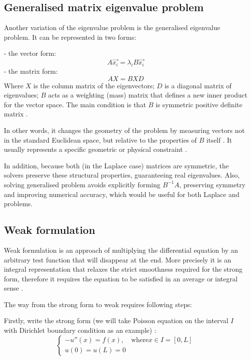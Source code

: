 \documentclass[conference]{IEEEtran}
\begin{document}
\subsection{Generalised matrix eigenvalue problem}
Another variation of the eigenvalue problem is the generalised eigenvalue problem. It can be represented in two forms:

- the vector form:
\begin{equation}
    A\vec{x_{i}} = \lambda_{i}B\vec{x_{i}}
\end{equation}
- the matrix form:
\begin{equation}
    AX = BXD
\end{equation}
Where $X$ is the column matrix of the eigenvectors; $D$ is a diagonal matrix of eigenvalues; $B$ acts as a weighting (mass) matrix that defines a new inner product for the vector space. The main condition is that $B$ is symmetric positive definite matrix \cite{b3}. 

In other words, it changes the geometry of the problem by measuring vectors not in the standard Euclidean space, but relative to the properties of $B$ itself \cite{b1}. It usually represents a specific geometric or physical constraint \cite{b2}. 

In addition, because both (in the Laplace case) matrices are symmetric, the solvers preserve these structural properties, guaranteeing real eigenvalues. Also, solving generalised problem avoids explicitly forming $B^{-1}A$, preserving symmetry and improving numerical accuracy, which would be useful for both Laplace and  problems.


\subsection{Weak formulation}
Weak formulation is an approach of multiplying the differential equation by an arbitrary test function that will disappear at the end. 
More precisely it is an integral representation that relaxes the strict smoothness required for the strong form, therefore it requires the equation to be satisfied in an average or integral sense \cite{b4}.

The way from the strong form to weak requires following steps:

Firstly, write the strong form (we will take Poisson equation on the interval $I$ with Dirichlet boundary condition as an example) \cite{b4.1}:
\begin{equation}
\begin{cases}
    -u''(x) = f(x), \quad \text{where} x \in I = [0, L] \\
    u(0) = u(L) = 0
    \label{eq:Poisson}
\end{cases}
\end{equation}
\end{document}
